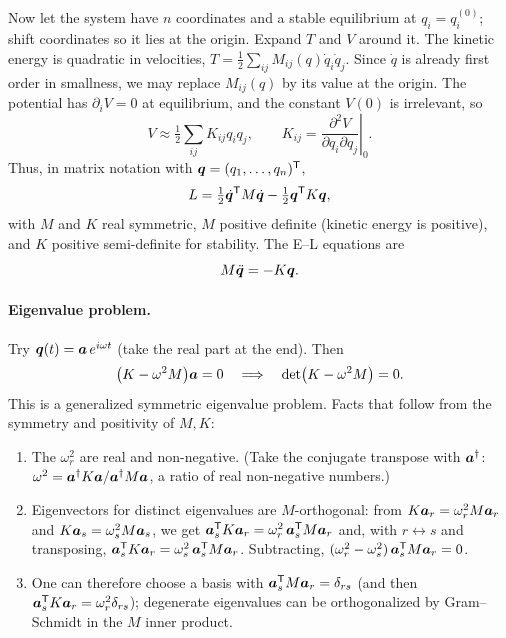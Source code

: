 \documentclass[11pt]{article}
\begin{document}
Now let the system have $n$ coordinates and a stable equilibrium at $q_i=q_i^{(0)}$; shift coordinates so it lies at the origin. Expand $T$ and $V$ around it. The kinetic energy is quadratic in velocities, $T=\tfrac12\sum_{ij}M_{ij}(q)\dot q_i\dot q_j$. Since $\dot q$ is already first order in smallness, we may replace $M_{ij}(q)$ by its value at the origin. The potential has $\partial_iV=0$ at equilibrium, and the constant $V(0)$ is irrelevant, so
\begin{equation}
  V\approx\tfrac12\sum_{ij}K_{ij}q_iq_j,\qquad K_{ij}=\left.\frac{\partial^2V}{\partial q_i\partial q_j}\right|_0 .
\end{equation}
Thus, in matrix notation with $\bm{q}=(q_1,\dots,q_n)^{\mathsf T}$,
\begin{equation}
  L=\tfrac12\dot{\bm{q}}^{\mathsf T}M\dot{\bm{q}}-\tfrac12\bm{q}^{\mathsf T}K\bm{q} ,
\end{equation}
with $M$ and $K$ real symmetric, $M$ positive definite (kinetic energy is positive), and $K$ positive semi-definite for stability. The E--L equations are
\begin{equation}
  M\ddot{\bm{q}}=-K\bm{q} .
\end{equation}

\paragraph{Eigenvalue problem.} Try $\bm{q}(t)=\bm{a}\,e^{i\omega t}$ (take the real part at the end). Then
\begin{equation}
  \bigl(K-\omega^2M\bigr)\bm{a}=0\quad\Longrightarrow\quad\det\bigl(K-\omega^2M\bigr)=0 .
\end{equation}
This is a generalized symmetric eigenvalue problem. Facts that follow from the symmetry and positivity of $M,K$:
\begin{enumerate}[nosep]
  \item The $\omega_r^2$ are real and non-negative. (Take the conjugate transpose with $\bm{a}^\dagger$: $\omega^2=\bm{a}^\dagger K\bm{a}/\bm{a}^\dagger M\bm{a}$, a ratio of real non-negative numbers.)
  \item Eigenvectors for distinct eigenvalues are $M$-orthogonal: from $K\bm{a}_r=\omega_r^2M\bm{a}_r$ and $K\bm{a}_s=\omega_s^2M\bm{a}_s$, we get $\bm{a}_s^{\mathsf T}K\bm{a}_r=\omega_r^2\,\bm{a}_s^{\mathsf T}M\bm{a}_r$ and, with $r\leftrightarrow s$ and transposing, $\bm{a}_s^{\mathsf T}K\bm{a}_r=\omega_s^2\,\bm{a}_s^{\mathsf T}M\bm{a}_r$. Subtracting, $(\omega_r^2-\omega_s^2)\,\bm{a}_s^{\mathsf T}M\bm{a}_r=0$.
  \item One can therefore choose a basis with $\bm{a}_s^{\mathsf T}M\bm{a}_r=\delta_{rs}$ (and then $\bm{a}_s^{\mathsf T}K\bm{a}_r=\omega_r^2\delta_{rs}$); degenerate eigenvalues can be orthogonalized by Gram--Schmidt in the $M$ inner product.
\end{enumerate}
\end{document}
